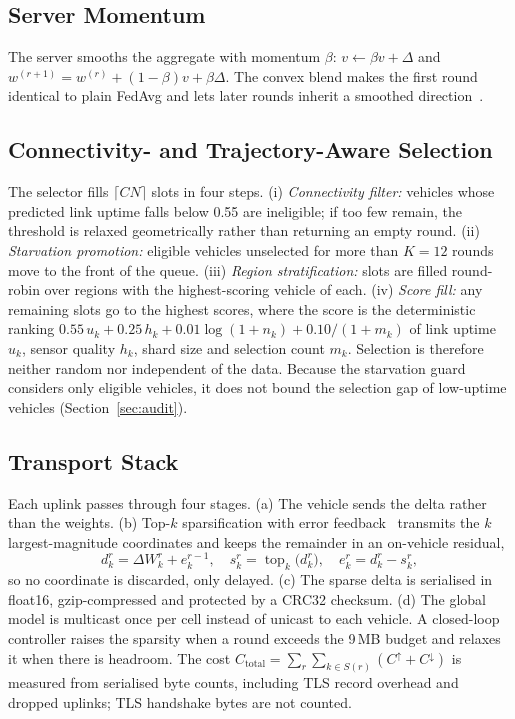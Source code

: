 \documentclass[journal]{IEEEtran}
\DeclareMathOperator{\topk}{top}
\begin{document}
\subsection{Server Momentum}
The server smooths the aggregate with momentum $\beta$: $v\leftarrow\beta v+\Delta$ and $w^{(r+1)}=w^{(r)}+(1-\beta)v+\beta\Delta$. The convex blend makes the first round identical to plain FedAvg and lets later rounds inherit a smoothed direction~\cite{hsu2019noniid}.

\subsection{Connectivity- and Trajectory-Aware Selection}\label{sec:selection}
The selector fills $\lceil CN\rceil$ slots in four steps. (i) \emph{Connectivity filter:} vehicles whose predicted link uptime falls below 0.55 are ineligible; if too few remain, the threshold is relaxed geometrically rather than returning an empty round. (ii) \emph{Starvation promotion:} eligible vehicles unselected for more than $K=12$ rounds move to the front of the queue. (iii) \emph{Region stratification:} slots are filled round-robin over regions with the highest-scoring vehicle of each. (iv) \emph{Score fill:} any remaining slots go to the highest scores, where the score is the deterministic ranking $0.55\,u_k+0.25\,h_k+0.01\log(1+n_k)+0.10/(1+m_k)$ of link uptime $u_k$, sensor quality $h_k$, shard size and selection count $m_k$. Selection is therefore neither random nor independent of the data. Because the starvation guard considers only eligible vehicles, it does not bound the selection gap of low-uptime vehicles (Section~\ref{sec:audit}).

\subsection{Transport Stack}\label{sec:transport}
Each uplink passes through four stages. (a) The vehicle sends the delta rather than the weights. (b) Top-$k$ sparsification with error feedback~\cite{stich2018sparsified,karimireddy2019ef} transmits the $k$ largest-magnitude coordinates and keeps the remainder in an on-vehicle residual,
\begin{equation}
d_k^{r}=\Delta W_k^{r}+e_k^{r-1},\quad s_k^{r}=\topk_k\!\big(d_k^{r}\big),\quad e_k^{r}=d_k^{r}-s_k^{r},
\label{eq:ef}
\end{equation}
so no coordinate is discarded, only delayed. (c) The sparse delta is serialised in float16, gzip-compressed and protected by a CRC32 checksum. (d) The global model is multicast once per cell instead of unicast to each vehicle. A closed-loop controller raises the sparsity when a round exceeds the 9\,MB budget and relaxes it when there is headroom. The cost $C_{\mathrm{total}}=\sum_{r}\sum_{k\in S(r)}(C^{\uparrow}+C^{\downarrow})$ is measured from serialised byte counts, including TLS record overhead and dropped uplinks; TLS handshake bytes are not counted.
\end{document}
